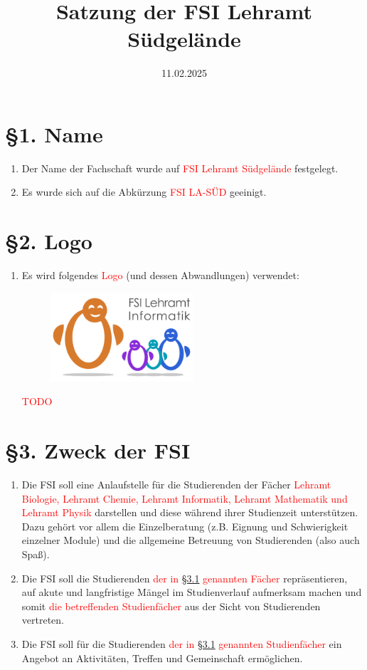 \documentclass[a4paper,12pt]{article}
\title{Satzung der FSI Lehramt Südgelände}
\date{11.02.2025}
\newcommand{\red}[1]{\textcolor{red}{#1}}
\begin{document}
\maketitle

\section*{§1. Name}

\begin{enumerate}
    \item Der Name der Fachschaft wurde auf \red{FSI Lehramt Südgelände} festgelegt.
    \item Es wurde sich auf die Abkürzung \red{FSI LA-SÜD} geeinigt.
\end{enumerate}

\section*{§2. Logo}

\begin{enumerate}
	\item
		Es wird folgendes \red{Logo} (und dessen Abwandlungen) verwendet:
		\begin{figure}[h]
			\includegraphics[width=0.5\textwidth]{img/logo.png}
		\end{figure}

		\red{TODO}
\end{enumerate}

\section*{§3. Zweck der FSI}

\begin{enumerate}
	\item
		\label{3.1}
		Die FSI soll eine Anlaufstelle für die Studierenden der Fächer \red{Lehramt Biologie, Lehramt Chemie, Lehramt Informatik, Lehramt Mathematik und Lehramt Physik}
		darstellen und diese während ihrer Studienzeit
		unterstützen. Dazu gehört vor allem die Einzelberatung (z.B.
		Eignung und Schwierigkeit einzelner Module) und die allgemeine
		Betreuung von Studierenden (also auch Spaß).
	\item
		Die FSI soll die Studierenden \red{der in \hyperref[3.1]{§3.1} genannten Fächer}
		repräsentieren, auf akute und langfristige Mängel im
		Studienverlauf aufmerksam machen und somit \red{die betreffenden Studienfächer} aus der Sicht von Studierenden vertreten.
	\item
		Die FSI soll für die Studierenden \red{der in \hyperref[3.1]{§3.1} genannten Studienfächer}
		ein Angebot an Aktivitäten, Treffen und Gemeinschaft
		ermöglichen.
\end{enumerate}
\end{document}
